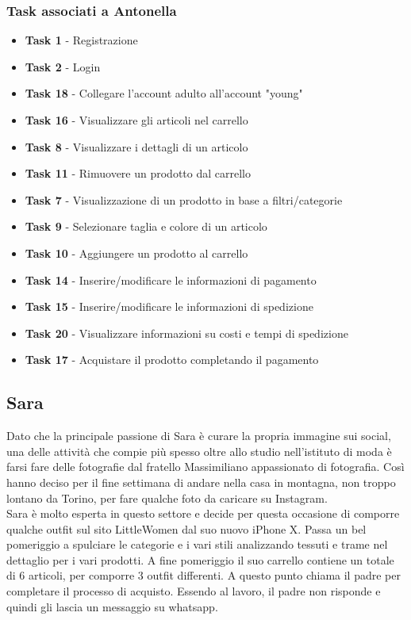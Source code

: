 \documentclass[12pt,a4paper]{report}
\begin{document}
\subsubsection*{Task associati a Antonella}
\begin{itemize}
\item \textbf{Task 1} - Registrazione
\item \textbf{Task 2} - Login
\item \textbf{Task 18} - Collegare l'account adulto all'account "young"
\item \textbf{Task 16} - Visualizzare gli articoli nel carrello
\item \textbf{Task 8} - Visualizzare i dettagli di un articolo
\item \textbf{Task 11} - Rimuovere un prodotto dal carrello
\item \textbf{Task 7} - Visualizzazione di un prodotto in base a filtri/categorie
\item \textbf{Task 9} - Selezionare taglia e colore di un articolo
\item \textbf{Task 10} - Aggiungere un prodotto al carrello
\item \textbf{Task 14} - Inserire/modificare le informazioni di pagamento
\item \textbf{Task 15} - Inserire/modificare le informazioni di spedizione
\item \textbf{Task 20} - Visualizzare informazioni su costi e tempi di spedizione
\item \textbf{Task 17} - Acquistare il prodotto completando il pagamento
\end{itemize}
\subsection*{Sara}
Dato che la principale passione di Sara è curare la propria immagine sui social, una delle attività che compie più spesso oltre allo studio nell'istituto di moda è farsi fare delle fotografie dal fratello Massimiliano appassionato di fotografia. Così hanno deciso per il fine settimana di andare nella casa in montagna, non troppo lontano da Torino, per fare qualche foto da caricare su Instagram.\\
Sara è molto esperta in questo settore e decide per questa occasione di comporre qualche outfit sul sito LittleWomen dal suo nuovo iPhone X. Passa un bel pomeriggio a spulciare le categorie e i vari stili analizzando tessuti e trame nel dettaglio per i vari prodotti. A fine pomeriggio il suo carrello contiene un totale di 6 articoli, per comporre 3 outfit differenti. A questo punto chiama il padre per completare il processo di acquisto. Essendo al lavoro, il padre non risponde e quindi gli lascia un messaggio su whatsapp.
\end{document}
